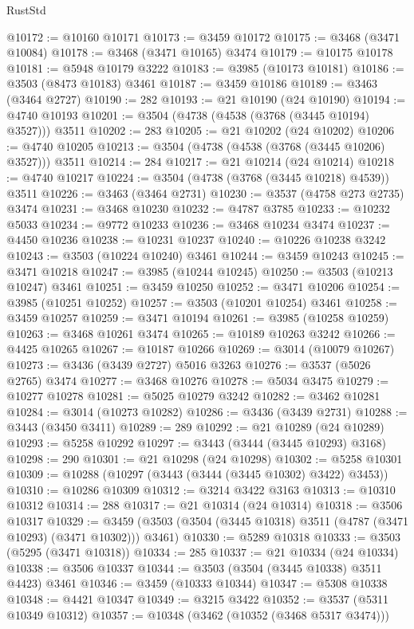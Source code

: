\begin{lexlean}{RustStd}
\begin{coremodule}
@10172 := @10160 @10171
@10173 := @3459 @10172
@10175 := @3468 (@3471 @10084)
@10178 := @3468 (@3471 @10165) @3474
@10179 := @10175 @10178
@10181 := @5948 @10179 @3222
@10183 := @3985 (@10173 @10181)
@10186 := @3503 (@8473 @10183) @3461
@10187 := @3459 @10186
@10189 := @3463 (@3464 @2727)
@10190 := 282
@10193 := @21 @10190 (@24 @10190)
@10194 := @4740 @10193
@10201 := @3504 (@4738 (@4538 (@3768 (@3445 @10194) @3527))) @3511
@10202 := 283
@10205 := @21 @10202 (@24 @10202)
@10206 := @4740 @10205
@10213 := @3504 (@4738 (@4538 (@3768 (@3445 @10206) @3527))) @3511
@10214 := 284
@10217 := @21 @10214 (@24 @10214)
@10218 := @4740 @10217
@10224 := @3504 (@4738 (@3768 (@3445 @10218) @4539)) @3511
@10226 := @3463 (@3464 @2731)
@10230 := @3537 (@4758 @273 @2735) @3474
@10231 := @3468 @10230
@10232 := @4787 @3785
@10233 := @10232 @5033
@10234 := @9772 @10233
@10236 := @3468 @10234 @3474
@10237 := @4450 @10236
@10238 := @10231 @10237
@10240 := @10226 @10238 @3242
@10243 := @3503 (@10224 @10240) @3461
@10244 := @3459 @10243
@10245 := @3471 @10218
@10247 := @3985 (@10244 @10245)
@10250 := @3503 (@10213 @10247) @3461
@10251 := @3459 @10250
@10252 := @3471 @10206
@10254 := @3985 (@10251 @10252)
@10257 := @3503 (@10201 @10254) @3461
@10258 := @3459 @10257
@10259 := @3471 @10194
@10261 := @3985 (@10258 @10259)
@10263 := @3468 @10261 @3474
@10265 := @10189 @10263 @3242
@10266 := @4425 @10265
@10267 := @10187 @10266
@10269 := @3014 (@10079 @10267)
@10273 := @3436 (@3439 @2727) @5016 @3263
@10276 := @3537 (@5026 @2765) @3474
@10277 := @3468 @10276
@10278 := @5034 @3475
@10279 := @10277 @10278
@10281 := @5025 @10279 @3242
@10282 := @3462 @10281
@10284 := @3014 (@10273 @10282)
@10286 := @3436 (@3439 @2731)
@10288 := @3443 (@3450 @3411)
@10289 := 289
@10292 := @21 @10289 (@24 @10289)
@10293 := @5258 @10292
@10297 := @3443 (@3444 (@3445 @10293) @3168)
@10298 := 290
@10301 := @21 @10298 (@24 @10298)
@10302 := @5258 @10301
@10309 := @10288 (@10297 (@3443 (@3444 (@3445 @10302) @3422) @3453))
@10310 := @10286 @10309
@10312 := @3214 @3422 @3163
@10313 := @10310 @10312
@10314 := 288
@10317 := @21 @10314 (@24 @10314)
@10318 := @3506 @10317
@10329 := @3459 (@3503 (@3504 (@3445 @10318) @3511 (@4787 (@3471 @10293) (@3471 @10302))) @3461)
@10330 := @5289 @10318
@10333 := @3503 (@5295 (@3471 @10318))
@10334 := 285
@10337 := @21 @10334 (@24 @10334)
@10338 := @3506 @10337
@10344 := @3503 (@3504 (@3445 @10338) @3511 @4423) @3461
@10346 := @3459 (@10333 @10344)
@10347 := @5308 @10338
@10348 := @4421 @10347
@10349 := @3215 @3422
@10352 := @3537 (@5311 @10349 @10312)
@10357 := @10348 (@3462 (@10352 (@3468 @5317 @3474)))

\end{coremodule}
\end{lexlean}
